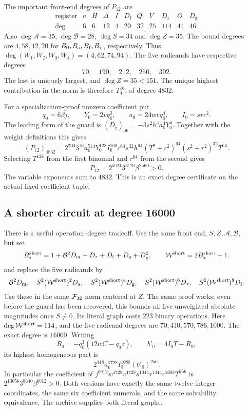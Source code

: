\documentclass[11pt,a4paper]{article}
\theoremstyle{definition}\newtheorem{definition}[theorem]{Definition}
\theoremstyle{remark}\newtheorem{remark}[theorem]{Remark}
\newcommand{\Dm}{D_{\mathrm m}}\newcommand{\Df}{D_{\mathrm f}}
\newcommand{\Dt}{D_{\tau}}\newcommand{\Da}{D_{\mathrm a}}
\newcommand{\Dg}{D_{\mathrm g}}\newcommand{\Pair}{\operatorname{Pair}}
\numberwithin{equation}{section}
\begin{document}
The important front-end degrees of $P_{12}$ are
\[
\begin{array}{c|rrrrrrrrrr}
\text{register}&a&H&\Delta&I&\Df&Q&V&\Da&O&\Dg\\\hline
\deg&6&6&12&4&20&32&25&114&44&46.
\end{array}
\]
Also $\deg\mathcal A=35$, $\deg\mathcal B=28$,
$\deg S=34$ and $\deg Z=35$.
The bound degrees are $4,58,12,20$ for
$B_0,B_{\rm a},B_{\rm f},B_\tau$, respectively.
Thus $\deg(W_1,W_2,W_3,W_4)=(4,62,74,94)$.
The five radicands have respective degrees
\[
70,\quad190,\quad212,\quad250,\quad302.
\]
The last is uniquely largest, and $\deg Z=35<151$.
The unique highest contribution in the norm is therefore $T_4^{16}$,
of degree $4832$.

For a specialization-proof nonzero coefficient put
\[
 q_0=6\beta j,\qquad Y_0=2vq_0^3,\qquad
 a_0=24wvq_0^4,\qquad I_0=src^2.
\]
The leading form of the guard is
$(\Dg)_{46}=-3s^2h^4a_0^4Y_0^4$.
Together with the weight definitions this gives
\[
 (P_{12})_{4832}
 =2^{704}3^{16}a_0^{544}Y_0^{128}I_0^{160}
   c^{64}s^{32}h^{64}(T^2+c^2)^{64}(s^2+r^2)^{32}T^{64}.
\]
Selecting $T^{128}$ from the first binomial and $r^{64}$ from the
second gives
\begin{equation}
 [j^{2560}w^{544}v^{672}h^{64}s^{192}r^{224}c^{384}T^{192}]P_{12}
   =2^{5024}3^{3120}\beta^{2560}>0.
 \label{eq:degree12}
\end{equation}
The variable exponents sum to $4832$. This is an exact degree certificate
on the actual fixed coefficient tuple.

\subsection{A shorter circuit at degree 16000}

There is a useful operation--degree tradeoff. Use the same front end,
$S,Z,\mathcal A,\mathcal B$, but set
\[
 B_*^{\rm short}=1+\mathcal B^2\Dm+\Dt+\Df+\Da+\Dg^2,
 \qquad \mathcal W^{\rm short}=2B_*^{\rm short}+1.
\]
and replace the five radicands by
\[
 \mathcal B^2\Dm,\quad
 S^2(\mathcal W^{\rm short})^2\Da,\quad
 S^2(\mathcal W^{\rm short})^4\Dg,\quad
 S^2(\mathcal W^{\rm short})^6\Dt,\quad
 S^2(\mathcal W^{\rm short})^8\Df.
\]
Use these in the same $\mathcal F_{32}$ norm centered at $Z$.
The same proof works; even before the guard has been recovered,
this bounds all five unweighted absolute magnitudes once $S\ne0$.
Its literal graph costs $223$ binary operations. Here
$\deg\mathcal W^{\rm short}=114$, and the five radicand degrees are
$70,410,570,786,1000$. The exact degree is $16000$.
Writing
\[
 R_0=-q_0^3(12wC-q_0z),\qquad b'_0=4I_0T-R_0,
\]
its highest homogeneous part is
\[
 2^{448}a_0^{1728}I_0^{1088}(b'_0)^{256}.
\]
In particular the coefficient of
$j^{6912}w^{1728}v^{1728}s^{1344}r^{1344}c^{2688}T^{256}$
is $2^{13056}3^{8640}\beta^{6912}>0$.
Both versions have exactly the same twelve integer coordinates, the same
six coefficient numerals, and the same solvability equivalence.
The archive supplies both literal graphs.
\end{document}
